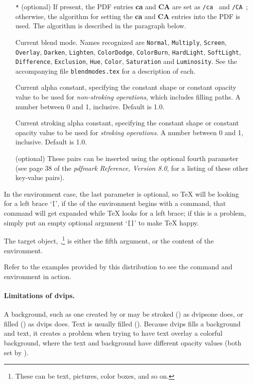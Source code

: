\documentclass{article}
\let\app\textsf
\begin{document}
\begin{enumerate}
 \item[\texttt{*}] (optional) If present, the PDF entries \textbf{ca} and \textbf{CA}
     are set as \texttt{/ca } and \texttt{/CA };
     otherwise, the algorithm for setting the \textbf{ca} and \textbf{CA}
     entries into the PDF is used. The algorithm is described in the
     paragraph \textbf{} below.
 \item[\ameta{BM}] Current blend mode. Names recognized are \texttt{Normal}, \texttt{Multiply},
 \texttt{Screen}, \texttt{Overlay}, \texttt{Darken},
 \texttt{Lighten}, \texttt{ColorDodge}, \texttt{ColorBurn},
 \texttt{HardLight}, \texttt{SoftLight}, \texttt{Difference},
 \texttt{Exclusion}, \texttt{Hue}, \texttt{Color}, \texttt{Saturation}  and
 \texttt{Luminosity}. See the accompanying file \texttt{blend\-modes.tex} for a description
                      of each.
 \item[\ameta{ca}] Current alpha constant, specifying the constant
      shape or constant opacity value to be used for \emph{non-stroking operations}, which
      includes filling paths. A number between 0 and 1, inclusive. Default is 1.0.
 \item[\ameta{CA}] Current stroking alpha constant, specifying the constant
      shape or constant opacity value to be used for \emph{stroking operations}.
      A number between 0 and 1, inclusive. Default is 1.0.
\item[\ameta{PDFKVs}] (optional) These pairs can be inserted using the optional
    fourth parameter (see page 38 of the \textsl{pdfmark Reference, Version
    8.0}, for a listing of these other key-value pairs).
\end{enumerate}
 In the environment case, the last parameter is optional, so {\TeX} will be
 looking for a left brace `\texttt{[}', if the  of the environment
 begins with a command, that command will get expanded while {\TeX} looks for
 a left brace; if this is a problem, simply put an empty optional argument
 `\texttt{[]}' to make {\TeX} happy.

The target object, ,\footnote
{These can be text, pictures, color boxes, and so on.} is either the fifth argument, or
the content of the environment.

Refer to the examples provided by this distribution to see the command and
environment in action.

\paragraph*{Limitations of \app{dvips}.}\label{para:limits} A background,
such as one created by  or  may be stroked
() as \app{dvipsone} does, or filled () as \app{dvips}
does. Text is usually filled (). Because \app{dvips} fills a
background and text, it creates a problem when trying to have text overlay a
colorful background, where the text and background have different opacity
values (both set by ).
\end{document}
